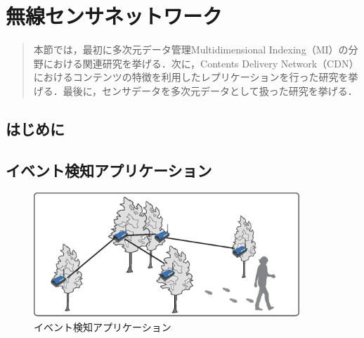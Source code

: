 \chapter{無線センサネットワーク}
\begin{large}
\begin{quote}
本節では，最初に多次元データ管理Multidimensional Indexing（MI）の分野における関連研究を挙げる．次に，Contents Delivery Network（CDN）におけるコンテンツの特徴を利用したレプリケーションを行った研究を挙げる．最後に，センサデータを多次元データとして扱った研究を挙げる．
\end{quote}
\end{large}
\clearpage

\section{はじめに}


\section{イベント検知アプリケーション}
\begin{figure}[htbp]
 \begin{center}
  \includegraphics[width=100mm]{./images/event_detection.eps}
 \end{center}
 \caption{イベント検知アプリケーション}
 \label{fig:event_detection}
\end{figure}


